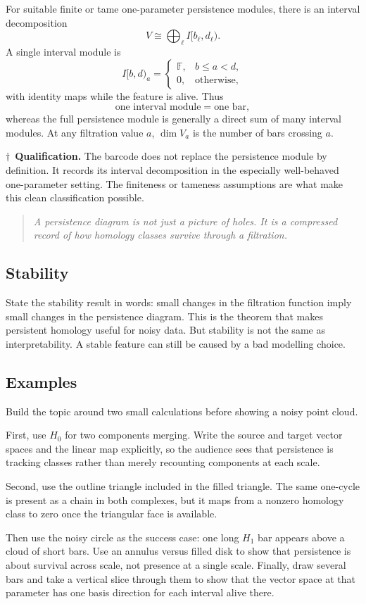 \documentclass[11pt,a4paper]{article}
\newcommand{\planningbox}[2]{%
\subsection*{#1}
#2
}
\newcommand{\phrase}[1]{%
\begin{quote}
\emph{#1}
\end{quote}
}
\newcommand{\qualification}[1]{%
\par\smallskip
\noindent\textcolor{blue!70!black}{\(\dagger\)\ \textbf{Qualification.}} #1
\par\smallskip
}
\begin{document}
{For suitable finite or tame one-parameter persistence modules, there is an
interval decomposition
\[
V\cong \bigoplus_{\ell} I[b_\ell,d_\ell).
\]
A single interval module is
\[
I[b,d)_a=
\begin{cases}
\mathbb F, & b\leq a<d,\\
0, & \text{otherwise},
\end{cases}
\]
with identity maps while the feature is alive. Thus
\[
\text{one interval module}=\text{one bar},
\]
whereas the full persistence module is generally a direct sum of many interval
modules. At any filtration value \(a\), \(\dim V_a\) is the number of bars
crossing \(a\).

\qualification{The barcode does not replace the persistence module by
definition. It records its interval decomposition in the especially
well-behaved one-parameter setting. The finiteness or tameness assumptions are
what make this clean classification possible.}
}

\phrase{A persistence diagram is not just a picture of holes. It is a compressed
record of how homology classes survive through a filtration.}

\planningbox{Stability}{
State the stability result in words: small changes in the filtration function
imply small changes in the persistence diagram. This is the theorem that makes
persistent homology useful for noisy data. But stability is not the same as
interpretability. A stable feature can still be caused by a bad modelling
choice.
}

\planningbox{Examples}{
Build the topic around two small calculations before showing a noisy point
cloud.

First, use \(H_0\) for two components merging. Write the source and target vector
spaces and the linear map explicitly, so the audience sees that persistence is
tracking classes rather than merely recounting components at each scale.

Second, use the outline triangle included in the filled triangle. The same
one-cycle is present as a chain in both complexes, but it maps from a nonzero
homology class to zero once the triangular face is available.

Then use the noisy circle as the success case: one long \(H_1\) bar appears
above a cloud of short bars. Use an annulus versus filled disk to show that
persistence is about survival across scale, not presence at a single scale.
Finally, draw several bars and take a vertical slice through them to show that
the vector space at that parameter has one basis direction for each interval
alive there.
}
\end{document}
